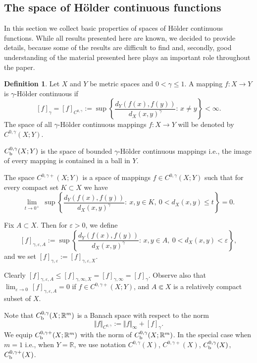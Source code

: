 \documentclass[intlimits,12pt,reqno]{amsart}
\newcommand{\R}{\mathbb R}
\newcommand{\eps}{\varepsilon}
\numberwithin{equation}{section}
\theoremstyle{definition}
\newtheorem{definition}[theorem]{Definition}
\begin{document}
\subsection{The space of H\"older continuous functions}
\label{Holder}
In this section we collect basic properties of spaces of H\"older continuous functions.
While all results presented here are known, we decided to provide details, because
some of the results are difficult to find and, secondly, 
good understanding of the material presented here plays an important role throughout the paper.
\begin{definition}
\label{d1}
Let $X$ and $Y$ be metric spaces and $0<\gamma\leq 1$. 
A mapping $f:X\to Y$ is $\gamma$-H\"older continuous if
\begin{equation}
\label{eq122}
[f]_{\gamma}=[f]_{C^{0,\gamma}}:=\sup\left\{\frac{d_Y(f(x),f(y))}{d_X(x,y)^\gamma}:\, x\neq y\right\}<\infty.
\end{equation}
The space of all $\gamma$-H\"older continuous mappings $f:X\to Y$ will be denoted by $C^{0,\gamma}(X;Y)$. 

$C^{0,\gamma}_{\rm b}(X;Y)$ is the space of bounded $\gamma$-H\"older continuous mappings i.e., the image of every mapping is contained in a ball in $Y$.

The space $C^{0,\gamma+}(X;Y)$ is a space of mappings $f\in C^{0,\gamma}(X;Y)$ such that for every compact set $K\subset X$ we have
$$
\lim_{t\to 0^+}\ \sup\left\{\frac{d_Y(f(x),f(y))}{d_X(x,y)^\gamma}:\ x,y\in K,\ 0<d_X(x,y)\leq t\right\}= 0.
$$

Fix $A\subset X$. Then for $\eps>0$, we define
\begin{equation}
\label{eq129}
[f]_{\gamma,\eps,A}:=\sup\left\{\frac{d_Y(f(x),f(y))}{d_X(x,y)^\gamma}:\, x,y\in A, \ 0<d_X(x,y)< \eps\right\},
\end{equation}
and we set $[f]_{\gamma,\eps}:=[f]_{\gamma,\eps,X}$.

Clearly $[f]_{\gamma,\eps,A}\leq [f]_{\gamma,\infty,X}=[f]_{\gamma,\infty}=[f]_{\gamma}$. 
Observe also that 
$\lim_{\eps\to 0} \, [f]_{\gamma,\eps,A}=0$
if  $f\in C^{0,\gamma+}(X;Y)$, and  $A\Subset X$ is a relatively compact subset of $X$.


Note that
$C_{\rm b}^{0,\gamma}(X;\R^m)$ is a Banach space with respect to the norm
$$
\Vert f\Vert_{C^{0,\gamma}}:=\Vert f\Vert_\infty+[f]_{\gamma}.
$$
We equip $C_{\rm b}^{0,\gamma+}(X;\R^m)$ with the norm of $C_{\rm b}^{0,\gamma}(X;\R^m)$.
In the special case when $m=1$ i.e., when $Y=\R$, we use notation $C^{0,\gamma}(X)$, $C^{0,\gamma+}(X)$, $C_{\rm b}^{0,\gamma}(X)$, $C_{\rm b}^{0,\gamma+}(X)$.
\end{definition}
\end{document}
